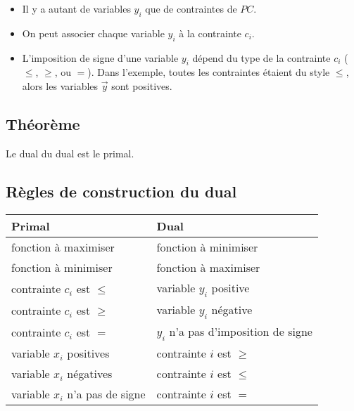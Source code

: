 \documentclass[a4paper, 11pt]{article}
\begin{document}
\begin{itemize}
  \item Il y a autant de variables $y_i$ que de contraintes de $PC$.
  \item On peut associer chaque variable $y_i$ à la contrainte $c_i${\small*}.
  \item L'imposition de signe d'une variable $y_i$ dépend du type de la contrainte $c_i$ ($\le$, $\ge$, ou $=$).
    Dans l'exemple, toutes les contraintes étaient du style $\le$, alors les variables $\vec{y}$ sont positives.
\end{itemize}



\subsection{Théorème}
  Le dual du dual est le primal.

\subsection{Règles de construction du dual}

\begin{tabular}{|l|l|}
  \hline
    \textbf{Primal} & \textbf{Dual} \\
  \hline
    fonction à maximiser & fonction à minimiser \\
  \hline
    fonction à minimiser & fonction à maximiser \\
  \hline
    contrainte $c_i$ est $\le$ & variable $y_i$ positive \\
  \hline
    contrainte $c_i$ est $\ge$ & variable $y_i$ négative \\
  \hline
    contrainte $c_i$ est $=$ & $y_i$ n'a pas d'imposition de signe \\
  \hline
    variable $x_i$ positives & contrainte $i$ est $\ge$ \\
  \hline
    variable $x_i$ négatives & contrainte $i$ est $\le$ \\
  \hline
    variable $x_i$ n'a pas de signe & contrainte $i$ est $=$ \\
  \hline
\end{tabular}
\end{document}
